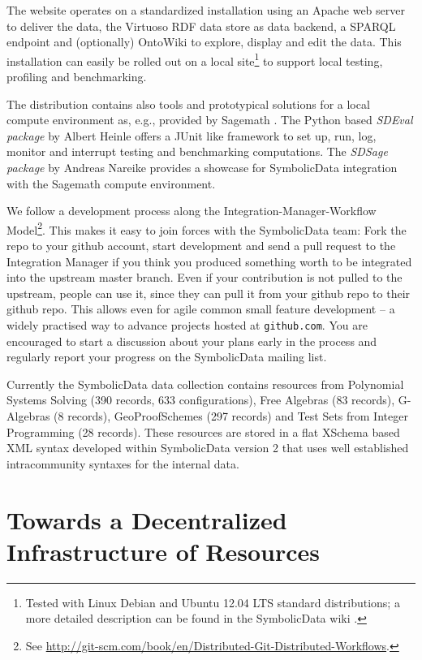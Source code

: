 \documentclass{llncs}
\newcommand{\SD}{{\sc Symbolic\-Data}}
\begin{document}
The website operates on a standardized installation using an Apache web server
to deliver the data, the Virtuoso RDF data store \cite{Virtuoso} as data
backend, a SPARQL endpoint and (optionally) OntoWiki \cite{OntoWiki} to
explore, display and edit the data. This installation can easily be rolled out
on a local site\footnote{Tested with Linux Debian and Ubuntu 12.04 LTS
  standard distributions; a more detailed description can be found in the
  {\SD} wiki \cite{sdwiki}.} to support local testing, profiling and
benchmarking.

The distribution contains also tools and prototypical solutions for a local
compute environment as, e.g., provided by Sagemath \cite{Sagemath}.  The
Python based \emph{SDEval package} \cite{sdeval} by Albert Heinle offers a
JUnit like framework to set up, run, log, monitor and interrupt testing and
benchmarking computations. The \emph{SDSage package} \cite{sdsage} by Andreas
Nareike provides a showcase for {\SD} integration with the Sagemath compute
environment.

We follow a development process along the Integration-Manager-Workflow
Model\footnote{See \url{http://git-scm.com/book/en/Distributed-Git-Distributed-Workflows}.}.
This makes it easy to join forces with the {\SD} team: Fork the repo to your
github account, start development and send a pull request to the Integration
Manager if you think you produced something worth to be integrated into the
upstream master branch.  Even if your contribution is not pulled to the
upstream, people can use it, since they can pull it from your github repo to
their github repo. This allows even for agile common small feature development
-- a widely practised way to advance projects hosted at \texttt{github.com}.
You are encouraged to start a discussion about your plans early in the process
and regularly report your progress on the {\SD} mailing list.

Currently the {\SD} data collection contains resources from Polynomial Systems
Solving (390 records, 633 configurations), Free Algebras (83 records),
G-Algebras (8 records), GeoProofSchemes (297 records) and Test Sets from
Integer Programming (28 records). These resources are stored in a flat XSchema
based XML syntax developed within {\SD} version 2 that uses well established
intracommunity syntaxes for the internal data.

\section{Towards a Decentralized Infrastructure of Resources}
\end{document}
